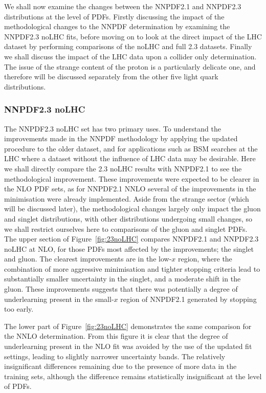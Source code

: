 We shall now examine the changes between the NNPDF2.1 and NNPDF2.3 distributions at the level of PDFs. Firstly discussing the impact of the methodological changes to the NNPDF determination by examining the NNPDF2.3 noLHC fits, before moving on to look at the direct impact of the LHC dataset by performing comparisons of the noLHC and full 2.3 datasets. Finally we shall discuss the impact of the LHC data upon a collider only determination. The issue of the strange content of the proton is a particularly delicate one, and therefore will be discussed separately from the other five light quark distributions.

\subsubsection{NNPDF2.3 noLHC}
The NNPDF2.3 noLHC set has two primary uses. To understand the improvements made in the NNPDF methodology by applying the updated procedure to the older dataset, and for applications such as BSM searches at the LHC where a dataset without the influence of LHC data may be desirable. Here we shall directly compare the 2.3 noLHC results with NNPDF2.1 to see the methodological improvement. These improvements were expected to be clearer in the NLO PDF sets, as for NNPDF2.1 NNLO several of the improvements in the minimisation were already implemented. Aside from the strange sector (which will be discussed later), the methodological changes largely only impact the gluon and singlet distributions, with other distributions undergoing small changes, so we shall restrict ourselves here to comparisons of the gluon and singlet PDFs. The upper section of Figure~\ref{fig:23noLHC} compares NNPDF2.1 and NNPDF2.3 noLHC at NLO, for those PDFs most affected by the improvements; the singlet and gluon. The clearest improvements are in the low-$x$ region, where the combination of more aggressive minimisation and tighter stopping criteria lead to substantially smaller uncertainty in the singlet, and a moderate shift in the gluon. These improvements suggests that there was potentially a degree of underlearning present in the small-$x$ region of NNPDF2.1 generated by stopping too early.

The lower part of Figure~\ref{fig:23noLHC} demonstrates the same comparison for the NNLO determination. From this figure it is clear that the degree of underlearning present in the NLO fit was avoided by the use of the updated fit settings, leading to slightly narrower uncertainty bands. The relatively insignificant differences remaining due to the presence of more data in the training sets, although the difference remains statistically insignificant at the level of PDFs.

